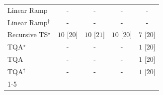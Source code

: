 \begin{tabular}{l|cccc|}
Linear Ramp & {\cellcolor[HTML]{000000}} \color[HTML]{F1F1F1} {\cellcolor{white}} \color{black} - & {\cellcolor[HTML]{000000}} \color[HTML]{F1F1F1} {\cellcolor{white}} \color{black} - & {\cellcolor[HTML]{000000}} \color[HTML]{F1F1F1} {\cellcolor{white}} \color{black} - & {\cellcolor[HTML]{000000}} \color[HTML]{F1F1F1} {\cellcolor{white}} \color{black} - \\
Linear Ramp$^\dagger$ & {\cellcolor[HTML]{000000}} \color[HTML]{F1F1F1} {\cellcolor{white}} \color{black} - & {\cellcolor[HTML]{000000}} \color[HTML]{F1F1F1} {\cellcolor{white}} \color{black} - & {\cellcolor[HTML]{000000}} \color[HTML]{F1F1F1} {\cellcolor{white}} \color{black} - & {\cellcolor[HTML]{000000}} \color[HTML]{F1F1F1} {\cellcolor{white}} \color{black} - \\
Recursive TS$^\star$ & {\cellcolor[HTML]{00441B}} \color[HTML]{F1F1F1} $10$ [$20$] & {\cellcolor[HTML]{00441B}} \color[HTML]{F1F1F1} $10$ [$21$] & {\cellcolor[HTML]{00441B}} \color[HTML]{F1F1F1} $10$ [$20$] & {\cellcolor[HTML]{37A055}} \color[HTML]{F1F1F1} $7$ [$20$] \\
TQA$^\star$ & {\cellcolor[HTML]{000000}} \color[HTML]{F1F1F1} {\cellcolor{white}} \color{black} - & {\cellcolor[HTML]{000000}} \color[HTML]{F1F1F1} {\cellcolor{white}} \color{black} - & {\cellcolor[HTML]{000000}} \color[HTML]{F1F1F1} {\cellcolor{white}} \color{black} - & {\cellcolor[HTML]{F7FCF5}} \color[HTML]{000000} $1$ [$20$] \\
TQA & {\cellcolor[HTML]{000000}} \color[HTML]{F1F1F1} {\cellcolor{white}} \color{black} - & {\cellcolor[HTML]{000000}} \color[HTML]{F1F1F1} {\cellcolor{white}} \color{black} - & {\cellcolor[HTML]{000000}} \color[HTML]{F1F1F1} {\cellcolor{white}} \color{black} - & {\cellcolor[HTML]{F7FCF5}} \color[HTML]{000000} $1$ [$20$] \\
TQA$^\dagger$ & {\cellcolor[HTML]{000000}} \color[HTML]{F1F1F1} {\cellcolor{white}} \color{black} - & {\cellcolor[HTML]{000000}} \color[HTML]{F1F1F1} {\cellcolor{white}} \color{black} - & {\cellcolor[HTML]{000000}} \color[HTML]{F1F1F1} {\cellcolor{white}} \color{black} - & {\cellcolor[HTML]{F7FCF5}} \color[HTML]{000000} $1$ [$20$] \\
\cline{1-5}
\bottomrule
\end{tabular}
